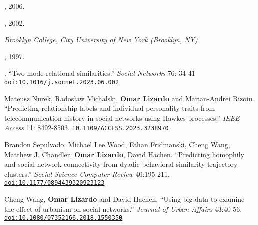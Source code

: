 \documentclass[10pt]{article}
\begin{document}
, 2006. 

, 2002.

\medskip
\noindent\emph{Brooklyn College, City University of New York (Brooklyn, NY) \vspace{0.02in}}

, 1997.

\bigskip
{}
    
\newpage
    
\medskip
{}
    
\newpage
{}
    
\bigskip
{}

. ``Two-mode relational similarities.'' {\em Social Networks}  76: 34-41 \href{https://doi.org/10.1016/j.socnet.2023.06.002}{\nolinkurl{doi:10.1016/j.socnet.2023.06.002}}


\ind Mateusz Nurek, Rados\l{}aw Michalski, {\bf Omar Lizardo} and Marian-Andrei Rizoiu. ``Predicting relationship labels and individual personality traits from telecommunication history in social networks using Hawkes processes.'' {\em IEEE Access} 11: 8492-8503. \href{https://doi.org/10.1109/ACCESS.2023.3238970}{\nolinkurl{10.1109/ACCESS.2023.3238970}}


\ind Brandon Sepulvado, Michael Lee Wood, Ethan Fridmanski, Cheng Wang, Matthew J. Chandler, {\bf Omar Lizardo}, David Hachen. ``Predicting homophily and social network connectivity from dyadic behavioral similarity trajectory clusters.'' {\em Social Science Computer Review} 40:195-211. \href{https://doi.org/10.1177/0894439320923123}{\nolinkurl{doi:10.1177/0894439320923123}}


\ind Cheng Wang, {\bf Omar Lizardo} and David Hachen. ``Using big data to examine the effect of urbanism on social networks.'' {\em Journal of Urban Affairs} 43:40-56. \href{https://doi.org/10.1080/07352166.2018.1550350}{\nolinkurl{doi:10.1080/07352166.2018.1550350}}
\end{document}

